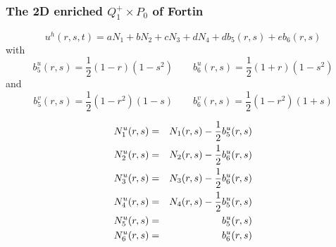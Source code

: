 \subsubsection{The 2D enriched $Q_1^+\times P_0$ of Fortin} \label{ss:Q1pP02D}



\[
u^h(r,s,t) = aN_1 + b N_2 + cN_3 +dN_4 + d b_5(r,s) + e b_{6}(r,s)
\]
with 
\[
b_5^u(r,s) = \frac{1}{2}(1-r)(1-s^2)
\qquad
b_6^u(r,s) = \frac{1}{2}(1+r)(1-s^2)
\]
and
\[
b_5^v(r,s) = \frac{1}{2}(1-r^2)(1-s)
\qquad
b_6^v(r,s) = \frac{1}{2}(1-r^2)(1+s)
\]

\begin{mdframed}[backgroundcolor=blue!5]
\begin{eqnarray}
{N}_1^u(r,s) &=&  N_1(r,s) - \frac{1}{2} b_5^u(r,s)\nonumber\\
{N}_2^u(r,s) &=&  N_2(r,s) - \frac{1}{2} b_{6}^u(r,s)\nonumber\\
{N}_3^u(r,s) &=&  N_3(r,s) - \frac{1}{2} b_{6}^u(r,s)\nonumber\\
{N}_4^u(r,s) &=&  N_4(r,s) - \frac{1}{2} b_5^u(r,s)\nonumber\\
{N}_5^u(r,s) &=&  b_5^u(r,s)\nonumber\\
{N}_{6}^u(r,s) &=&  b_{6}^u(r,s) \nonumber
\end{eqnarray}
\end{mdframed}














